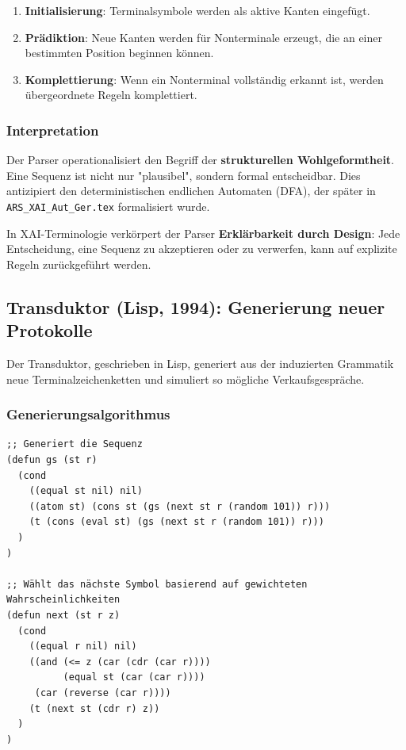 \documentclass[12pt,a4paper]{article}
\begin{document}
\begin{enumerate}
    \item \textbf{Initialisierung}: Terminalsymbole werden als aktive Kanten 
    eingefügt.
    \item \textbf{Prädiktion}: Neue Kanten werden für Nonterminale erzeugt, 
    die an einer bestimmten Position beginnen können.
    \item \textbf{Komplettierung}: Wenn ein Nonterminal vollständig erkannt ist, 
    werden übergeordnete Regeln komplettiert.
\end{enumerate}

\subsubsection{Interpretation}

Der Parser operationalisiert den Begriff der \textbf{strukturellen 
Wohlgeformtheit}. Eine Sequenz ist nicht nur "plausibel", sondern formal 
entscheidbar. Dies antizipiert den deterministischen endlichen Automaten (DFA), 
der später in \texttt{ARS\_XAI\_Aut\_Ger.tex} formalisiert wurde.

In XAI-Terminologie verkörpert der Parser \textbf{Erklärbarkeit durch Design}: 
Jede Entscheidung, eine Sequenz zu akzeptieren oder zu verwerfen, kann auf 
explizite Regeln zurückgeführt werden.

\subsection{Transduktor (Lisp, 1994): Generierung neuer Protokolle}

Der Transduktor, geschrieben in Lisp, generiert aus der induzierten Grammatik 
neue Terminalzeichenketten und simuliert so mögliche Verkaufsgespräche.

\subsubsection{Generierungsalgorithmus}

\begin{lstlisting}[caption=Transduktor in Lisp]
;; Generiert die Sequenz
(defun gs (st r)
  (cond
    ((equal st nil) nil)
    ((atom st) (cons st (gs (next st r (random 101)) r)))
    (t (cons (eval st) (gs (next st r (random 101)) r)))
  )
)

;; Wählt das nächste Symbol basierend auf gewichteten Wahrscheinlichkeiten
(defun next (st r z)
  (cond
    ((equal r nil) nil)
    ((and (<= z (car (cdr (car r)))) 
          (equal st (car (car r))))
     (car (reverse (car r))))
    (t (next st (cdr r) z))
  )
)
\end{lstlisting}
\end{document}
